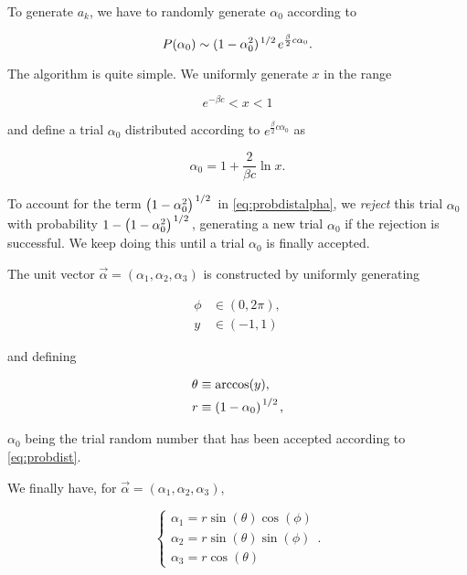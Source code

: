\documentclass[reqno,12pt]{article}
\numberwithin{equation}{section}
\begin{document}
To generate $a_k$, we have to randomly generate $\alpha_0$ according to

\begin{equation} \label{eq:probdistalpha}
	P(\alpha_0) \sim (1 - \alpha_0^2)^{\flatfrac{1}{2}} e^{\frac{\beta}{2}c\alpha_0}.
\end{equation}

The algorithm is quite simple. We uniformly generate $x$ in the range 

\begin{equation}
	e^{-\beta c} < x < 1
\end{equation} 

and define a trial $\alpha_0$ distributed according to $e^{\frac{\beta}{2}c\alpha_0}$ as

\begin{equation}
	\alpha_0 = 1 + \frac{2}{\beta c}\ln{x}.
\end{equation}

To account for the term $\qty(1 - \alpha_0^2)^{\flatfrac{1}{2}}$ in \eqref{eq:probdistalpha}, we \textit{reject} this trial
$\alpha_0$ with probability $1 - \qty(1 - \alpha_0^2)^{\flatfrac{1}{2}}$, generating a new trial $\alpha_0$ if 
the rejection is successful. We keep doing this until a trial $\alpha_0$ is finally accepted. 

The unit vector $\vec{\alpha} = (\alpha_1, \alpha_2, \alpha_3)$ is constructed by uniformly generating 

\begin{equation}
	\begin{aligned}
		\phi &\in (0, 2\pi), \\
		y &\in (-1, 1)
	\end{aligned}
\end{equation}

and defining 

\begin{equation}
	\begin{aligned}
		\theta &\equiv \arccos(y), \\
		r &\equiv \qty(1 - \alpha_0)^{\flatfrac{1}{2}},
	\end{aligned}
\end{equation}

$\alpha_0$ being the trial random number that has been accepted according to \eqref{eq:probdist}. 

We finally have, for $\vec{\alpha} = (\alpha_1, \alpha_2, \alpha_3)$,

\begin{equation}
	\begin{cases}
		\alpha_1 = r \sin(\theta) \cos(\phi) \\
		\alpha_2 = r \sin(\theta) \sin(\phi) \\
		\alpha_3 = r \cos(\theta)
	\end{cases}.
\end{equation}
\end{document}

